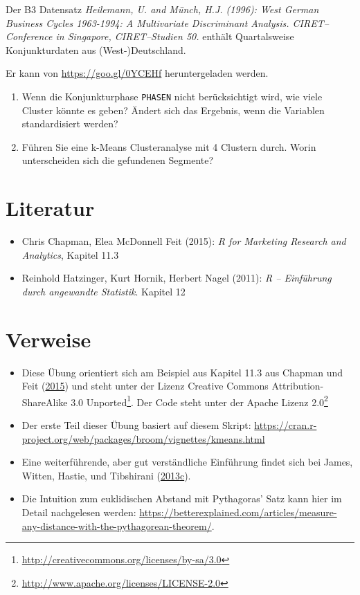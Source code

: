 \documentclass[12pt,ngerman,]{book}
\providecommand{\tightlist}{%
  \setlength{\itemsep}{0pt}\setlength{\parskip}{0pt}}
\let\rmarkdownfootnote\footnote%
\def\footnote{\protect\rmarkdownfootnote}
\renewcommand{\href}[2]{#2\footnote{\url{#1}}}
\begin{document}
Der B3 Datensatz \emph{Heilemann, U. and Münch, H.J. (1996): West German
Business Cycles 1963-1994: A Multivariate Discriminant Analysis.
CIRET--Conference in Singapore, CIRET--Studien 50.} enthält
Quartalsweise Konjunkturdaten aus (West-)Deutschland.

Er kann von \url{https://goo.gl/0YCEHf} heruntergeladen werden.

\begin{enumerate}
\def\labelenumi{\arabic{enumi}.}
\tightlist
\item
  Wenn die Konjunkturphase \texttt{PHASEN} nicht berücksichtigt wird,
  wie viele Cluster könnte es geben? Ändert sich das Ergebnis, wenn die
  Variablen standardisiert werden?
\item
  Führen Sie eine k-Means Clusteranalyse mit 4 Clustern durch. Worin
  unterscheiden sich die gefundenen Segmente?
\end{enumerate}

\section{Literatur}\label{literatur-1}

\begin{itemize}
\tightlist
\item
  Chris Chapman, Elea McDonnell Feit (2015): \emph{R for Marketing
  Research and Analytics}, Kapitel 11.3
\item
  Reinhold Hatzinger, Kurt Hornik, Herbert Nagel (2011): \emph{R --
  Einführung durch angewandte Statistik}. Kapitel 12
\end{itemize}

\section{Verweise}\label{verweise-8}

\begin{itemize}
\item
  Diese Übung orientiert sich am Beispiel aus Kapitel 11.3 aus Chapman
  und Feit (\protect\hyperlink{ref-Chapman2015}{2015}) und steht unter
  der Lizenz
  \href{http://creativecommons.org/licenses/by-sa/3.0}{Creative Commons
  Attribution-ShareAlike 3.0 Unported}. Der Code steht unter der
  \href{http://www.apache.org/licenses/LICENSE-2.0}{Apache Lizenz 2.0}
\item
  Der erste Teil dieser Übung basiert auf diesem Skript:
  \url{https://cran.r-project.org/web/packages/broom/vignettes/kmeans.html}
\item
  Eine weiterführende, aber gut verständliche Einführung findet sich bei
  James, Witten, Hastie, und Tibshirani
  (\protect\hyperlink{ref-james2013introduction}{2013}\protect\hyperlink{ref-james2013introduction}{c}).
\item
  Die Intuition zum euklidischen Abstand mit Pythagoras' Satz kann hier
  im Detail nachgelesen werden:
  \url{https://betterexplained.com/articles/measure-any-distance-with-the-pythagorean-theorem/}.
\end{itemize}
\end{document}

